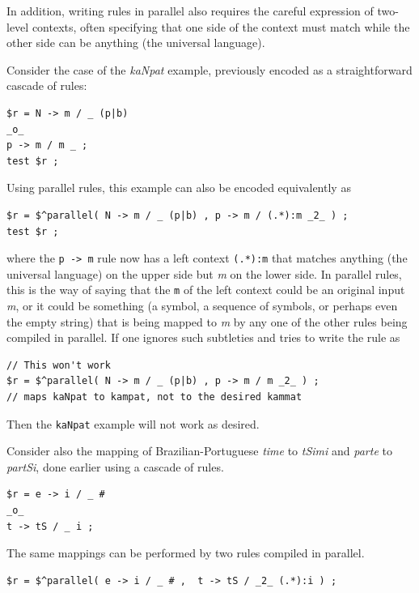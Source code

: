 	In addition,
writing rules in parallel
also requires the careful expression of two-level contexts, often specifying that one side
of the context must match while the other side can be anything (the universal language).

Consider the case of the \emph{kaNpat} example, previously encoded as a
straightforward cascade of
rules:

\begin{Verbatim}
$r = N -> m / _ (p|b)
_o_
p -> m / m _ ;
test $r ;
\end{Verbatim}

\noindent
Using parallel rules, this example can also be encoded equivalently as

\begin{Verbatim}
$r = $^parallel( N -> m / _ (p|b) , p -> m / (.*):m _2_ ) ;
test $r ;
\end{Verbatim}

\noindent
where the \texttt{p -> m} rule now has a left context \texttt{(.*):m} that matches
anything (the universal language) on the upper side but \emph{m} on the lower
side.  In parallel rules, this is the way of saying that the \texttt{m} of the left context could
be an original input \emph{m}, or it could be something (a symbol, a sequence of symbols,
or perhaps even the empty string) that is being mapped to \emph{m} by
any one of the other rules
being compiled in parallel.  If one ignores such subtleties and tries to write the
rule as

\begin{Verbatim}
// This won't work
$r = $^parallel( N -> m / _ (p|b) , p -> m / m _2_ ) ;
// maps kaNpat to kampat, not to the desired kammat
\end{Verbatim}

\noindent
Then the \texttt{kaNpat} example will not work as desired.


Consider also the mapping of Brazilian-Portuguese \emph{time} to \emph{tSimi} and \emph{parte} to \emph{partSi}, done earlier using a cascade of rules.  


\begin{Verbatim}
$r = e -> i / _ #
_o_
t -> tS / _ i ;
\end{Verbatim}

\noindent
The same mappings can be performed by two rules compiled in parallel.

\begin{Verbatim}
$r = $^parallel( e -> i / _ # ,  t -> tS / _2_ (.*):i ) ;
\end{Verbatim}

